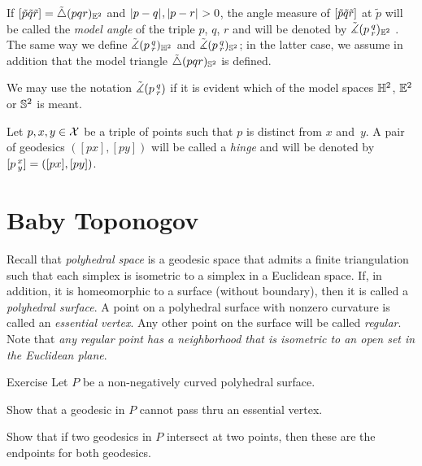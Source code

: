 If 
$[\tilde p\tilde q\tilde r]=\tilde\triangle(p q r)_{\mathbb{E}^2}$ 
and $\dist{p}{q}{},\dist{p}{r}{}>0$, 
the angle measure of 
$[\tilde p\tilde q\tilde r]$ at $\tilde p$ 
will be called the \emph{model angle} of the triple $p$, $q$, $r$ and will be denoted by
$\tilde\measuredangle(p\,{}^{q}_{r})_{\mathbb{E}^2}$%
\index{$\tilde\measuredangle$!$\angk{{*}}{{*}}{{*}}$}.
The same way we define $\tilde\measuredangle(p\,{}^{q}_{r})_{\mathbb{H}^2}$ and $\tilde\measuredangle(p\,{}^{q}_{r})_{\mathbb{S}^2}$;
in the latter case, we assume in addition that the model triangle $\tilde\triangle(p q r)_{\mathbb{S}^2}$ is defined.

We may use the notation $\tilde\measuredangle(p\,{}^{q}_{r})$ if it is evident which of the model spaces $\mathbb{H}^2$, $\mathbb{E}^2$ or $\mathbb{S}^2$ is meant.

 Let $p,x,y\in \mathcal{X}$ be a triple of points such that $p$ is distinct from $x$ and~$y$.
A pair of geodesics $([p x],[p y])$ will be called  a \emph{hinge} and will be denoted by 
$[p\,{}^{x}_{y}]=([p x],[p y])$\index{$\hinge{{*}}{{*}}{{*}}$}.

\section{Baby Toponogov}

Recall that \emph{polyhedral space} is a geodesic space that admits a finite triangulation such that each simplex is isometric to a simplex in a Euclidean space.
If, in addition, it is homeomorphic to a surface (without boundary), then it is called a \emph{polyhedral surface}.
A point on a polyhedral surface with nonzero curvature is called an \emph{essential vertex}.
Any other point on the surface will be called \emph{regular}.
Note that \textit{any regular point has a neighborhood that is isometric to an open set in the Euclidean plane}.

\begin{thm}{Exercise}\label{ex:poly+geod}
Let $P$ be a non-negatively curved polyhedral surface.

\begin{subthm}{}
Show that a geodesic in $P$ cannot pass thru an essential vertex.
\end{subthm}

\begin{subthm}{}
Show that if two geodesics in $P$ intersect at two points, 
then these are the endpoints for both geodesics.
\end{subthm}

\end{thm}

